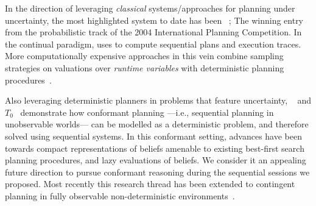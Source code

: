 






In the direction of leveraging {\em classical} systems/approaches for
planning under uncertainty, the most highlighted system to date has
been ~\cite{yoon:etal:2007}; The winning entry from
the probabilistic track of the 2004 International Planning
Competition.  In the continual paradigm, 
uses  to compute sequential plans and execution traces.
More computationally expensive approaches in this vein combine
sampling strategies on valuations over {\em runtime variables} with
deterministic planning procedures~\cite{yoon:etal:2008}. %

Also leveraging deterministic planners in problems that feature
uncertainty, ~\cite{hoffmann:brafman:2006} and
$T_0$~\cite{palacios:geffner:2009} demonstrate how conformant planning
---i.e., sequential planning in unobservable worlds--- can be modelled
as a deterministic problem, and therefore solved using sequential
systems. In this conformant setting, advances have been towards
compact representations of beliefs amenable to existing best-first
search planning procedures, and lazy evaluations of beliefs. We
consider it an appealing future direction to pursue conformant
reasoning during the sequential sessions we proposed. Most
recently this research thread has been extended to contingent planning
in fully observable non-deterministic
environments~\cite{albore:etal:2009}.
